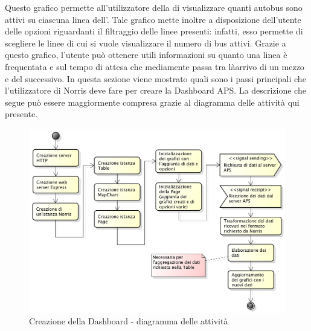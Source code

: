     		Questo grafico permette all'utilizzatore della  di visualizzare quanti autobus sono attivi su ciascuna linea dell'. Tale grafico mette inoltre a disposizione dell'utente delle opzioni riguardanti il filtraggio delle linee presenti: infatti, esso permette di scegliere le linee di cui si vuole visualizzare il numero di bus attivi. Grazie a questo grafico, l'utente può ottenere utili informazioni su quanto una linea è frequentata e sul tempo di attesa che mediamente passa tra làarrivo di un mezzo e del successivo.
        In questa sezione viene mostrato quali sono i passi principali che l'utilizzatore di Norris deve fare per creare la Dashboard APS. La descrizione che segue può essere maggiormente compresa grazie al diagramma delle attività qui presente.
        \begin{figure}[H]\centering
            \includegraphics[width=\textwidth]{SpecificaTecnica/Pics/CreateDashboard}
            \caption{Creazione della Dashboard - diagramma delle attività}
        \end{figure}
